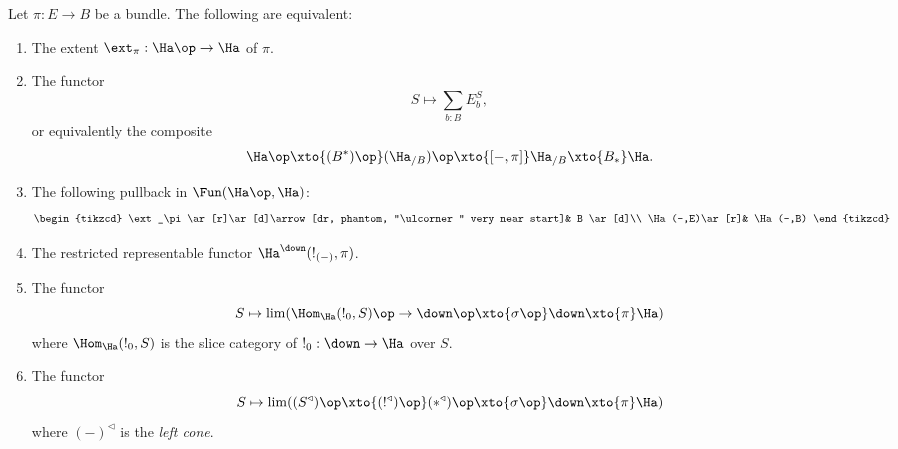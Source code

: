 \begin{prop}\label{prop:set.characterizing.extent}
  Let $\pi : E \to B$ be a bundle. The following are equivalent:
  \begin{enumerate}
  \item The extent $\ext_{\pi} : \Ha\op \to \Ha$ of $\pi$.
  \item The functor
    $$S \mapsto \sum_{b : B} E_b^S,$$
    or equivalently the composite
  $$\Ha\op \xto{(B^{\ast})\op} (\Ha_{/B})\op \xto{[-, \pi]} \Ha_{/B}
  \xto{B_{\ast}} \Ha.$$
\item The following pullback in $\Fun(\Ha\op, \Ha)$: 
\[
\begin{tikzcd}
	\ext_\pi\ar[r]\ar[d]\arrow[dr, phantom,
      "\ulcorner" very near start]&
	B \ar[d]\\
	\Ha(-,E)\ar[r]&
	\Ha(-,B)
\end{tikzcd}
\]
\item The restricted representable functor
  $\Ha^{\down}(!_{(-)}, \pi)$.
\item The functor
  $$S \mapsto \lim(\Hom_{\Ha}(!_0, S)\op \to \down\op \xto{\sigma\op} \down \xto{\pi} \Ha)$$
  where $\Hom_{\Ha}(!_0, S)$ is the slice category of $!_0 : \down \to
  \Ha$ over $S$.
\item The functor
  $$S \mapsto \lim(( S^{\triangleleft} )\op \xto{( !^{\triangleleft} )\op}
  (\ast^{\triangleleft})\op \xto{\sigma\op} \down
  \xto{\pi} \Ha)$$
  where $(-)^{\triangleleft}$ is the \emph{left cone}.
  \end{enumerate}
\end{prop}
